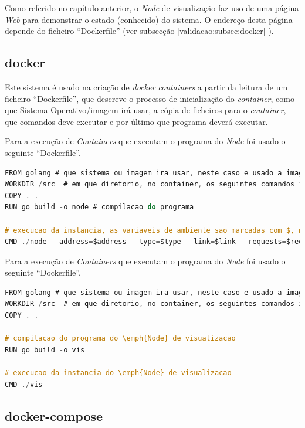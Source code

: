 Como referido no capítulo anterior, o \emph{Node} de visualização faz uso de uma página \emph{Web} para demonstrar o estado (conhecido) do sistema. O endereço desta página depende do ficheiro ``Dockerfile'' (ver subsecção 
\ref{validacao:subsec:docker}
).


\subsection*{docker}
\label{validacao:subsec:docker}
Este sistema é usado na criação de \emph{docker containers} a partir da leitura de um ficheiro ``Dockerfile'', que descreve o processo de inicialização do \emph{container}, como que Sistema Operativo/imagem irá usar, a cópia de ficheiros para o \emph{container}, que comandos deve executar e por último que programa deverá executar.


Para a execução de \emph{Containers} que executam o programa do \emph{Node} foi usado o seguinte ``Dockerfile''.
\begin{lstlisting}[caption={``Dockerfile'' do \emph{Node}},language=C]
FROM golang # que sistema ou imagem ira usar, neste caso e usado a imagem ``golang''
WORKDIR /src  # em que diretorio, no container, os seguintes comandos irao ser executados
COPY . .
RUN go build -o node # compilacao do programa

# execucao da instancia, as variaveis de ambiente sao marcadas com $, no entanto serao descritas a sua origem de seguida
CMD ./node --address=$address --type=$type --link=$link --requests=$requests --visualization=$VIS_ADDRESS
\end{lstlisting}
 
Para a execução de \emph{Containers} que executam o programa do \emph{Node} foi usado o seguinte ``Dockerfile''.
\begin{lstlisting}[caption={``Dockerfile'' do \emph{Node}},language=C]
FROM golang # que sistema ou imagem ira usar, neste caso e usado a imagem ``golang''
WORKDIR /src  # em que diretorio, no container, os seguintes comandos irao ser executados
COPY . .

# compilacao do programa do \emph{Node} de visualizacao
RUN go build -o vis

# execucao da instancia do \emph{Node} de visualizacao
CMD ./vis

\end{lstlisting}

\subsection*{docker-compose}

